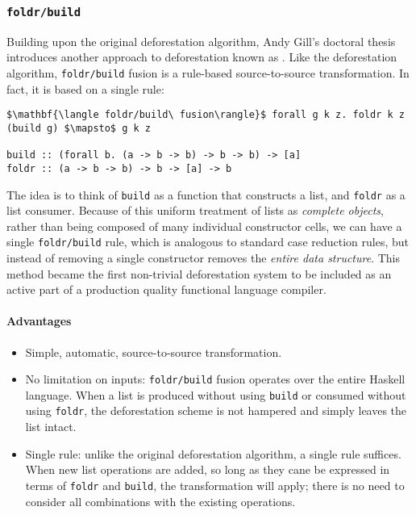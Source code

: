 \subsubsection{\texttt{foldr/build}}

Building upon the original deforestation algorithm, Andy
Gill's doctoral thesis introduces another approach to deforestation known as
 \cite{Gill:1996tf,Gill:1993}.
Like the deforestation algorithm, \texttt{foldr/build} fusion is a rule-based
source-to-source transformation. In fact, it is based on a single rule:
%
\begin{lstlisting}[style=Haskell,numbers=none,mathescape,caption={The \texttt{foldr/build} transformation}]
$\mathbf{\langle foldr/build\ fusion\rangle}$ forall g k z. foldr k z (build g) $\mapsto$ g k z

build :: (forall b. (a -> b -> b) -> b -> b) -> [a]
foldr :: (a -> b -> b) -> b -> [a] -> b
\end{lstlisting}

The idea is to think of \texttt{build} as a function that constructs a list, and
\texttt{foldr} as a list consumer. Because of this uniform treatment of lists as
\emph{complete objects}, rather than being composed of many individual
constructor cells, we can have a single \texttt{foldr/build} rule, which is
analogous to standard case reduction rules, but instead of removing a single
constructor removes the \emph{entire data structure}. This method became the
first non-trivial deforestation system to be included as an active part of a
production quality functional language compiler.

\paragraph{Advantages}
\begin{itemize}
    \item Simple, automatic, source-to-source transformation.

    \item No limitation on inputs: \texttt{foldr/build} fusion operates over the
        entire Haskell language. When a list is produced without using
        \texttt{build} or consumed without using \texttt{foldr}, the
        deforestation scheme is not hampered and simply leaves the list intact.

    \item Single rule: unlike the original deforestation algorithm, a single
        rule suffices. When new list operations are added, so long as they cane
        be expressed in terms of \texttt{foldr} and \texttt{build}, the
        transformation will apply; there is no need to consider all combinations
        with the existing operations.
\end{itemize}


